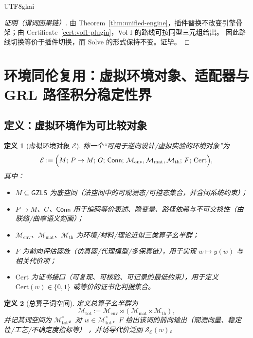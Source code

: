 \documentclass[12pt]{article}
\newtheorem{definition}{定义}[section]
\newcommand{\GZLS}{\ensuremath{\mathsf{GZLS}}}
\newcommand{\Conn}{\ensuremath{\mathsf{Conn}}}
\begin{document}
\begin{CJK*}{UTF8}{gkai}
\begin{proof}[证明（谓词因果链）]
由 Theorem~\ref{thm:unified-engine}，插件替换不改变引擎骨架；由 Certificate~\ref{cert:vol1-plugin}，Vol I 的路线可按同型三元组给出。
因此路线切换等价于插件切换，而 $\mathrm{Solve}$ 的形式保持不变。证毕。
\end{proof}

\clearpage
\section{环境同伦复用：虚拟环境对象、适配器与 GRL 路径积分稳定性界}
\label{sec:env-homotopy-reuse}

\subsection{定义：虚拟环境作为可比较对象}

\begin{definition}[虚拟环境对象 $\mathcal{E}$]
\label{def:env-object}
称一个“可用于逆向设计/虚拟实验的环境对象”为
\[
\mathcal{E}
:=
\Bigl(
M;\,P\to M;\,G;\,\Conn;\,
\mathcal{M}_{\mathrm{env}},\mathcal{M}_{\mathrm{mat}},\mathcal{M}_{\mathrm{th}};\,
F;\,\mathrm{Cert}
\Bigr),
\]
其中：
\begin{itemize}
  \item $M\subseteq \GZLS$ 为底空间（法空间中的可观测态/可控态集合，并含闭系统约束）；
  \item $P\to M$、$G$、$\Conn$ 用于编码等价表述、隐变量、路径依赖与不可交换性（由联络/曲率语义刻画）；
  \item $\mathcal{M}_{\mathrm{env}}$、$\mathcal{M}_{\mathrm{mat}}$、$\mathcal{M}_{\mathrm{th}}$ 为环境/材料/理论近似三类算子幺半群；
  \item $F$ 为前向评估器族（仿真器/代理模型/多保真链），用于实现 $w\mapsto y(w)$ 与相关代价项；
  \item $\mathrm{Cert}$ 为证书接口（可复现、可核验、可记录的最低约束），用于定义 $\mathrm{Cert}(w)\in\{0,1\}$ 或等价的证书化判据集合。
\end{itemize}
\end{definition}

\begin{definition}[总算子词空间]
\label{def:env-wordspace}
定义总算子幺半群为
\[
\mathcal{M}_{\mathrm{tot}}
:=
\mathcal{M}_{\mathrm{env}}\rtimes(\mathcal{M}_{\mathrm{mat}}\rtimes \mathcal{M}_{\mathrm{th}}),
\]
并记其词空间为 $\mathcal{M}_{\mathrm{tot}}^{\ast}$。对 $w\in \mathcal{M}_{\mathrm{tot}}^{\ast}$，$F$ 给出该词的前向输出（观测向量、稳定性/工艺/不确定度指标等）
  ，并诱导代价泛函 $\mathcal{S}_{\mathcal{E}}(w)$。
\end{definition}


\end{CJK*}
\end{document}
